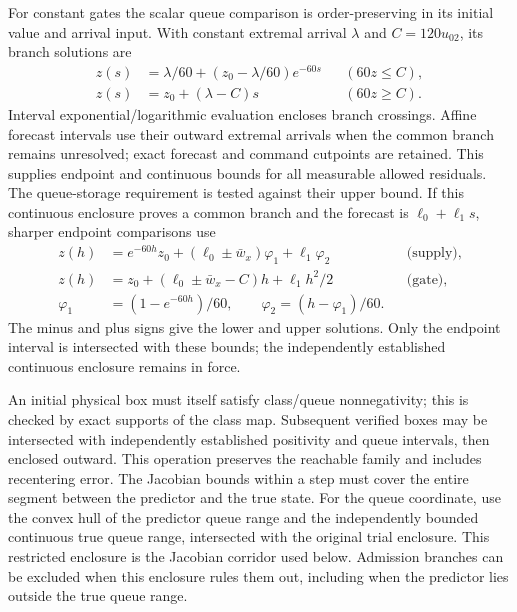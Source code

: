 For constant gates the scalar queue comparison is order-preserving in its
initial value and arrival input. With constant extremal arrival $\lambda$
and $C=120u_{02}$, its branch solutions are
\begin{equation}
 \begin{aligned}
 z(s)&=\lambda/60+(z_0-\lambda/60)e^{-60s}
                    &&(60z\le C),\\
 z(s)&=z_0+(\lambda-C)s &&(60z\ge C).
 \end{aligned}
 \label{eq:structure-queue-flows}
\end{equation}
Interval exponential/logarithmic evaluation encloses branch crossings.
Affine forecast intervals use their outward extremal arrivals when the common
branch remains unresolved; exact forecast and command cutpoints are retained.
This supplies endpoint and continuous bounds for all measurable allowed
residuals. The queue-storage requirement is tested against their upper bound.
If this continuous enclosure proves a common branch and the forecast is
$\ell_0+\ell_1s$, sharper endpoint comparisons use
\begin{equation}
\begin{aligned}
 z(h)&=e^{-60h}z_0+(\ell_0\pm\bar w_x)\varphi_1+\ell_1\varphi_2
       &&\text{(supply)},\\
 z(h)&=z_0+(\ell_0\pm\bar w_x-C)h+\ell_1h^2/2
       &&\text{(gate)},\\
 \varphi_1&=(1-e^{-60h})/60,\qquad
 \varphi_2=(h-\varphi_1)/60.
\end{aligned}
\end{equation}
The minus and plus signs give the lower and upper solutions. Only the
endpoint interval is intersected with these bounds; the independently
established continuous enclosure remains in force.

An initial physical box must itself satisfy class/queue nonnegativity; this
is checked by exact supports of the class map. Subsequent verified boxes may
be intersected with independently established positivity and queue intervals,
then enclosed outward. This operation preserves the reachable family and
includes recentering error. The Jacobian bounds within a step must cover the entire segment between
the predictor and the true state. For the queue coordinate, use the convex
hull of the predictor queue range and the independently bounded continuous
true queue range, intersected with the original trial enclosure. This
restricted enclosure is the Jacobian corridor used below. Admission branches
can be excluded when this enclosure rules them out, including when the
predictor lies outside the true queue range.

